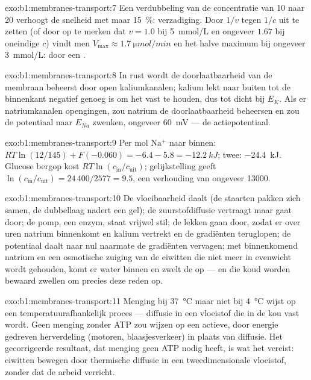 \begin{solution}{exo:b1:membranes-transport:7}
Een verdubbeling van de concentratie van 10 naar 20 verhoogt de snelheid met
maar \qty{15}{\%}: verzadiging. Door $1/v$ tegen $1/c$ uit te zetten (of door op
te merken dat $v = 1.0$ bij \qty{5}{mmol/L} en ongeveer $1.67$ bij oneindige $c$)
vindt men $V_{\max} \approx \qty{1.7}{\micro mol/min}$ en het halve maximum bij
ongeveer \qty{3}{mmol/L}:  door een .
\end{solution}

\begin{solution}{exo:b1:membranes-transport:8}
In rust wordt de doorlaatbaarheid van de membraan beheerst door open
kaliumkanalen; kalium lekt naar buiten tot de binnenkant negatief genoeg is om het
vast te houden, dus tot dicht bij $E_K$. Als er natriumkanalen opengingen, zou
natrium de doorlaatbaarheid beheersen en zou de potentiaal naar $E_{Na}$
zwenken, ongeveer \qty{+60}{mV} --- de actiepotentiaal.
\end{solution}

\begin{solution}{exo:b1:membranes-transport:9}
Per mol $\mathrm{Na^+}$ naar binnen: $RT\ln(12/145) + F(-0.060) = -6.4 - 5.8
= \qty{-12.2}{kJ}$; twee: \qty{-24.4}{kJ}. Glucose bergop kost
$RT\ln(c_{\text{in}}/c_{\text{uit}})$; gelijkstelling geeft
$\ln(c_{\text{in}}/c_{\text{uit}}) = 24\,400/2577 = 9.5$, een verhouding van
ongeveer \num{13000}.
\end{solution}

\begin{solution}{exo:b1:membranes-transport:10}
De vloeibaarheid daalt (de staarten pakken zich samen, de dubbellaag nadert een
gel); de zuurstofdiffusie vertraagt maar gaat door; de pomp, een enzym, staat
vrijwel stil; de lekken gaan door, zodat er over uren natrium binnenkomt en
kalium vertrekt en de gradiënten teruglopen; de potentiaal daalt naar nul
naarmate de gradiënten vervagen; met binnenkomend natrium en een osmotische
zuiging van de eiwitten die niet meer in evenwicht wordt gehouden, komt er water
binnen en zwelt de  op ---  en  die koud worden bewaard zwellen
om precies deze reden op.
\end{solution}

\begin{solution}{exo:b1:membranes-transport:11}
Menging bij \qty{37}{\celsius} maar niet bij \qty{4}{\celsius} wijst op een
temperatuurafhankelijk proces --- diffusie in een vloeistof die in de kou vast
wordt. Geen menging zonder ATP zou wijzen op een actieve, door energie gedreven
herverdeling (motoren, blaasjesverkeer) in plaats van diffusie. Het gecorrigeerde
resultaat, dat menging geen ATP nodig heeft, is wat het 
vereist: eiwitten bewegen door thermische diffusie in een tweedimensionale
vloeistof, zonder dat de  arbeid verricht.
\end{solution}

